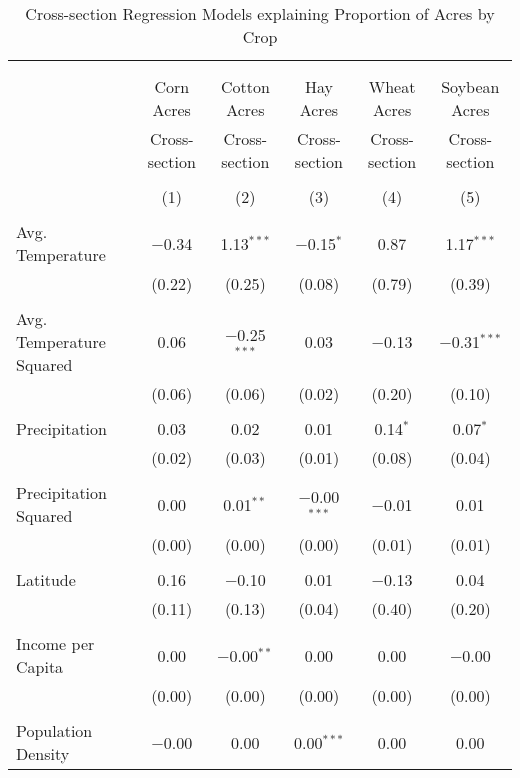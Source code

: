 \documentclass[10pt]{article}
\begin{document}
\newpage
\begin{table}[!htbp] \centering 
  \caption{Cross-section Regression Models explaining Proportion of Acres by Crop} 
  \label{} 
\footnotesize 
\begin{tabular}{@{\extracolsep{5pt}}lccccc} 
\\[-1.8ex]\hline 
\hline \\[-1.8ex] 
\\[-1.8ex] & Corn Acres & Cotton Acres & Hay Acres & Wheat Acres & Soybean Acres \\ 
 & Cross-section & Cross-section & Cross-section & Cross-section & Cross-section \\ 
\\[-1.8ex] & (1) & (2) & (3) & (4) & (5)\\ 
\hline \\[-1.8ex] 
 Avg. Temperature & $-$0.34 & 1.13$^{***}$ & $-$0.15$^{*}$ & 0.87 & 1.17$^{***}$ \\ 
  & (0.22) & (0.25) & (0.08) & (0.79) & (0.39) \\ 
  & & & & & \\ 
 Avg. Temperature Squared & 0.06 & $-$0.25$^{***}$ & 0.03 & $-$0.13 & $-$0.31$^{***}$ \\ 
  & (0.06) & (0.06) & (0.02) & (0.20) & (0.10) \\ 
  & & & & & \\ 
 Precipitation & 0.03 & 0.02 & 0.01 & 0.14$^{*}$ & 0.07$^{*}$ \\ 
  & (0.02) & (0.03) & (0.01) & (0.08) & (0.04) \\ 
  & & & & & \\ 
 Precipitation Squared & 0.00 & 0.01$^{**}$ & $-$0.00$^{***}$ & $-$0.01 & 0.01 \\ 
  & (0.00) & (0.00) & (0.00) & (0.01) & (0.01) \\ 
  & & & & & \\ 
 Latitude & 0.16 & $-$0.10 & 0.01 & $-$0.13 & 0.04 \\ 
  & (0.11) & (0.13) & (0.04) & (0.40) & (0.20) \\ 
  & & & & & \\ 
 Income per Capita & 0.00 & $-$0.00$^{**}$ & 0.00 & 0.00 & $-$0.00 \\ 
  & (0.00) & (0.00) & (0.00) & (0.00) & (0.00) \\ 
  & & & & & \\ 
 Population Density & $-$0.00 & 0.00 & 0.00$^{***}$ & 0.00 & 0.00 \\ 

\end{tabular}
\end{table}
\end{document}
